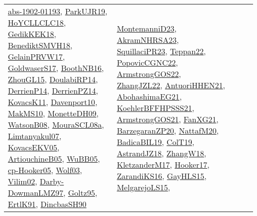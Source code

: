 {\begin{longtable}{lp{3cm}>{\raggedright}p{6cm}>{\raggedright}p{6cm}p{8cm}}
\href{articles/abs-1902-01193.pdf}{abs-1902-01193}\cite{abs-1902-01193}, \href{papers/ParkUJR19.pdf}{ParkUJR19}\cite{ParkUJR19}, \href{papers/HoYCLLCLC18.pdf}{HoYCLLCLC18}\cite{HoYCLLCLC18}, \href{articles/GedikKEK18.pdf}{GedikKEK18}\cite{GedikKEK18}, \href{papers/BenediktSMVH18.pdf}{BenediktSMVH18}\cite{BenediktSMVH18}, \href{papers/GelainPRVW17.pdf}{GelainPRVW17}\cite{GelainPRVW17}, \href{papers/GoldwaserS17.pdf}{GoldwaserS17}\cite{GoldwaserS17}, \href{papers/BoothNB16.pdf}{BoothNB16}\cite{BoothNB16}, \href{papers/ZhouGL15.pdf}{ZhouGL15}\cite{ZhouGL15}, \href{papers/DoulabiRP14.pdf}{DoulabiRP14}\cite{DoulabiRP14}, \href{papers/DerrienP14.pdf}{DerrienP14}\cite{DerrienP14}, \href{papers/DerrienPZ14.pdf}{DerrienPZ14}\cite{DerrienPZ14}, \href{articles/KovacsK11.pdf}{KovacsK11}\cite{KovacsK11}, \href{papers/Davenport10.pdf}{Davenport10}\cite{Davenport10}, \href{papers/MakMS10.pdf}{MakMS10}\cite{MakMS10}, \href{papers/MonetteDH09.pdf}{MonetteDH09}\cite{MonetteDH09}, \href{papers/WatsonB08.pdf}{WatsonB08}\cite{WatsonB08}, \href{papers/MouraSCL08a.pdf}{MouraSCL08a}\cite{MouraSCL08a}, \href{papers/Limtanyakul07.pdf}{Limtanyakul07}\cite{Limtanyakul07}, \href{papers/KovacsEKV05.pdf}{KovacsEKV05}\cite{KovacsEKV05}, \href{papers/ArtiouchineB05.pdf}{ArtiouchineB05}\cite{ArtiouchineB05}, \href{papers/WuBB05.pdf}{WuBB05}\cite{WuBB05}, \href{papers/cp-Hooker05.pdf}{cp-Hooker05}\cite{cp-Hooker05}, \href{papers/Wolf03.pdf}{Wolf03}\cite{Wolf03}, \href{papers/Vilim02.pdf}{Vilim02}\cite{Vilim02}, \href{articles/Darby-DowmanLMZ97.pdf}{Darby-DowmanLMZ97}\cite{Darby-DowmanLMZ97}, \href{papers/Goltz95.pdf}{Goltz95}\cite{Goltz95}, \href{papers/ErtlK91.pdf}{ErtlK91}\cite{ErtlK91}, \href{articles/DincbasSH90.pdf}{DincbasSH90}\cite{DincbasSH90} & \href{articles/MontemanniD23.pdf}{MontemanniD23}\cite{MontemanniD23}, \href{articles/AkramNHRSA23.pdf}{AkramNHRSA23}\cite{AkramNHRSA23}, \href{papers/SquillaciPR23.pdf}{SquillaciPR23}\cite{SquillaciPR23}, \href{papers/Teppan22.pdf}{Teppan22}\cite{Teppan22}, \href{papers/PopovicCGNC22.pdf}{PopovicCGNC22}\cite{PopovicCGNC22}, \href{papers/ArmstrongGOS22.pdf}{ArmstrongGOS22}\cite{ArmstrongGOS22}, \href{papers/ZhangJZL22.pdf}{ZhangJZL22}\cite{ZhangJZL22}, \href{papers/AntuoriHHEN21.pdf}{AntuoriHHEN21}\cite{AntuoriHHEN21}, \href{articles/AbohashimaEG21.pdf}{AbohashimaEG21}\cite{AbohashimaEG21}, \href{articles/KoehlerBFFHPSSS21.pdf}{KoehlerBFFHPSSS21}\cite{KoehlerBFFHPSSS21}, \href{papers/ArmstrongGOS21.pdf}{ArmstrongGOS21}\cite{ArmstrongGOS21}, \href{articles/FanXG21.pdf}{FanXG21}\cite{FanXG21}, \href{papers/BarzegaranZP20.pdf}{BarzegaranZP20}\cite{BarzegaranZP20}, \href{papers/NattafM20.pdf}{NattafM20}\cite{NattafM20}, \href{papers/BadicaBIL19.pdf}{BadicaBIL19}\cite{BadicaBIL19}, \href{papers/ColT19.pdf}{ColT19}\cite{ColT19}, \href{papers/AstrandJZ18.pdf}{AstrandJZ18}\cite{AstrandJZ18}, \href{articles/ZhangW18.pdf}{ZhangW18}\cite{ZhangW18}, \href{papers/KletzanderM17.pdf}{KletzanderM17}\cite{KletzanderM17}, \href{papers/Hooker17.pdf}{Hooker17}\cite{Hooker17}, \href{articles/ZarandiKS16.pdf}{ZarandiKS16}\cite{ZarandiKS16}, \href{papers/GayHLS15.pdf}{GayHLS15}\cite{GayHLS15}, \href{papers/MelgarejoLS15.pdf}{MelgarejoLS15}\cite{MelgarejoLS15}, 
\end{longtable}}

